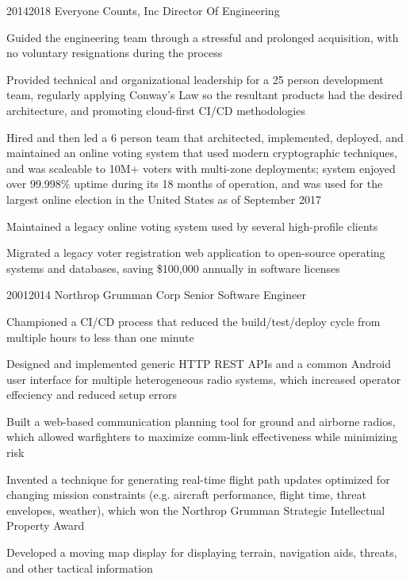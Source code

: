 \documentclass{article}
\begin{document}
\job
  {2014}{2018}
  {Everyone Counts, Inc}
  {Director Of Engineering}
  {\begin{achievements}
    \item Guided the engineering team through a stressful and prolonged acquisition, with no voluntary resignations during the process
    \item Provided technical and organizational leadership for a 25 person development team, regularly applying Conway's Law so the resultant products had the desired architecture, and promoting cloud-first CI/CD methodologies
    \item Hired and then led a 6 person team that architected, implemented, deployed, and maintained an online voting system that used modern cryptographic techniques, and was scaleable to 10M+ voters with multi-zone deployments; system enjoyed over 99.998\% uptime during its 18 months of operation, and was used for the largest online election in the United States as of September 2017
    \item Maintained a legacy online voting system used by several high-profile clients
    \item Migrated a legacy voter registration web application to open-source operating systems and databases, saving \$100,000 annually in software licenses
  \end{achievements}}

\job
  {2001}{2014}
  {Northrop Grumman Corp}
  {Senior Software Engineer}
  {\begin{achievements}
    \item Championed a CI/CD process that reduced the build/test/deploy cycle from multiple hours to less than one minute
    \item Designed and implemented generic HTTP REST APIs and a common Android user interface for multiple heterogeneous radio systems, which increased operator effeciency and reduced setup errors
    \item Built a web-based communication planning tool for ground and airborne radios, which allowed warfighters to maximize comm-link effectiveness while minimizing risk
    \item Invented a technique for generating real-time flight path updates optimized for changing mission constraints (e.g. aircraft performance, flight time, threat envelopes, weather), which won the Northrop Grumman Strategic Intellectual Property Award
    \item Developed a moving map display for displaying terrain, navigation aids, threats, and other tactical information
  \end{achievements}}
\end{document}
